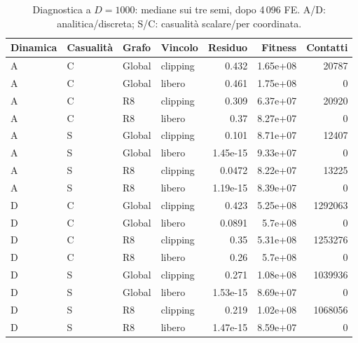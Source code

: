 \begin{table}[H]\centering\small
\caption{Diagnostica a $D=1000$: mediane sui tre semi, dopo 4\,096 FE. A/D: analitica/discreta; S/C: casualità scalare/per coordinata.}\label{tab:subspace}
\begin{tabular}{@{}llllrrr@{}}
\toprule Dinamica & Casualità & Grafo & Vincolo & Residuo & Fitness & Contatti\\\midrule
A & C & Global & clipping & 0.432 & 1.65e+08 & 20787\\
A & C & Global & libero & 0.461 & 1.75e+08 & 0\\
A & C & R8 & clipping & 0.309 & 6.37e+07 & 20920\\
A & C & R8 & libero & 0.37 & 8.27e+07 & 0\\
A & S & Global & clipping & 0.101 & 8.71e+07 & 12407\\
A & S & Global & libero & 1.45e-15 & 9.33e+07 & 0\\
A & S & R8 & clipping & 0.0472 & 8.22e+07 & 13225\\
A & S & R8 & libero & 1.19e-15 & 8.39e+07 & 0\\
D & C & Global & clipping & 0.423 & 5.25e+08 & 1292063\\
D & C & Global & libero & 0.0891 & 5.7e+08 & 0\\
D & C & R8 & clipping & 0.35 & 5.31e+08 & 1253276\\
D & C & R8 & libero & 0.26 & 5.7e+08 & 0\\
D & S & Global & clipping & 0.271 & 1.08e+08 & 1039936\\
D & S & Global & libero & 1.53e-15 & 8.69e+07 & 0\\
D & S & R8 & clipping & 0.219 & 1.02e+08 & 1068056\\
D & S & R8 & libero & 1.47e-15 & 8.59e+07 & 0\\
\bottomrule\end{tabular}
\end{table}

